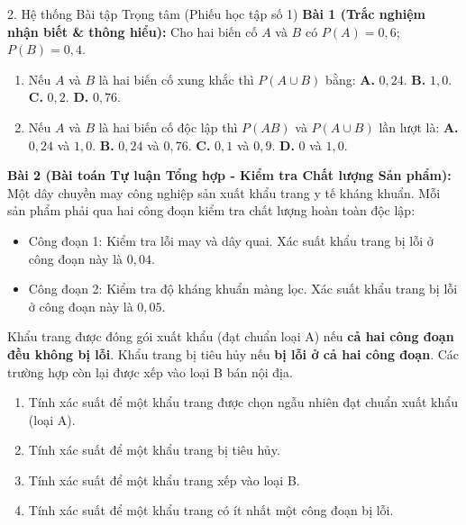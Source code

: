 \documentclass[12pt, a4paper]{article}
\begin{document}
\begin{pedabox}{2. Hệ thống Bài tập Trọng tâm (Phiếu học tập số 1)}
\textbf{Bài 1 (Trắc nghiệm nhận biết \& thông hiểu):}
Cho hai biến cố $A$ và $B$ có $P(A) = 0{,}6$; $P(B) = 0{,}4$.
\begin{enumerate}[leftmargin=0.6cm]
    \item[a)] Nếu $A$ và $B$ là hai biến cố xung khắc thì $P(A \cup B)$ bằng:
    \quad \textbf{A.} $0{,}24$. \quad \textbf{B.} $1{,}0$. \quad \textbf{C.} $0{,}2$. \quad \textbf{D.} $0{,}76$.
    \item[b)] Nếu $A$ và $B$ là hai biến cố độc lập thì $P(AB)$ và $P(A \cup B)$ lần lượt là:
    \quad \textbf{A.} $0{,}24$ và $1{,}0$. \quad \textbf{B.} $0{,}24$ và $0{,}76$. \quad \textbf{C.} $0{,}1$ và $0{,}9$. \quad \textbf{D.} $0$ và $1{,}0$.
\end{enumerate}

\textbf{Bài 2 (Bài toán Tự luận Tổng hợp - Kiểm tra Chất lượng Sản phẩm):}
Một dây chuyền may công nghiệp sản xuất khẩu trang y tế kháng khuẩn. Mỗi sản phẩm phải qua hai công đoạn kiểm tra chất lượng hoàn toàn độc lập:
\begin{itemize}[leftmargin=0.5cm]
    \item Công đoạn 1: Kiểm tra lỗi may và dây quai. Xác suất khẩu trang bị lỗi ở công đoạn này là $0{,}04$.
    \item Công đoạn 2: Kiểm tra độ kháng khuẩn màng lọc. Xác suất khẩu trang bị lỗi ở công đoạn này là $0{,}05$.
\end{itemize}
Khẩu trang được đóng gói xuất khẩu (đạt chuẩn loại A) nếu \textbf{cả hai công đoạn đều không bị lỗi}. Khẩu trang bị tiêu hủy nếu \textbf{bị lỗi ở cả hai công đoạn}. Các trường hợp còn lại được xếp vào loại B bán nội địa.
\begin{enumerate}[leftmargin=0.6cm]
    \item[a)] Tính xác suất để một khẩu trang được chọn ngẫu nhiên đạt chuẩn xuất khẩu (loại A).
    \item[b)] Tính xác suất để một khẩu trang bị tiêu hủy.
    \item[c)] Tính xác suất để một khẩu trang xếp vào loại B.
    \item[d)] Tính xác suất để một khẩu trang có ít nhất một công đoạn bị lỗi.
\end{enumerate}
\end{pedabox}
\end{document}
